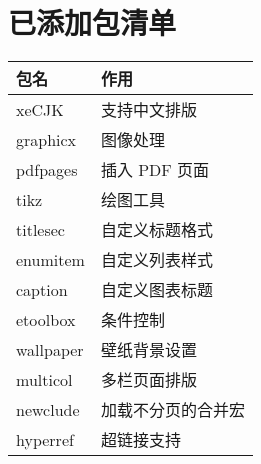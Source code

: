 \documentclass[a4paper,12pt]{ctexart}
\begin{document}
	
	\newpage
	\section{已添加包清单}
	\begin{table}[!ht]
		\centering
		\renewcommand{\arraystretch}{1.2}
		\begin{tabularx}{\textwidth}{
				|l|>{\centering\arraybackslash}X|}
			\hline
			\textbf{包名}& \textbf{作用}\\\hline
			xeCJK & 支持中文排版 \\\hline
			graphicx & 图像处理 \\ \hline
			pdfpages & 插入 PDF 页面 \\ \hline
			tikz & 绘图工具 \\ \hline
			titlesec & 自定义标题格式 \\\hline 
			enumitem & 自定义列表样式 \\ \hline
			caption & 自定义图表标题 \\ \hline
			etoolbox & 条件控制 \\ \hline
			wallpaper & 壁纸背景设置 \\ \hline
			multicol & 多栏页面排版 \\ \hline
			newclude & 加载不分页的合并宏 \\ \hline
			hyperref & 超链接支持 \\ \hline
		\end{tabularx}
	\end{table}

	\newpage
\end{document}
